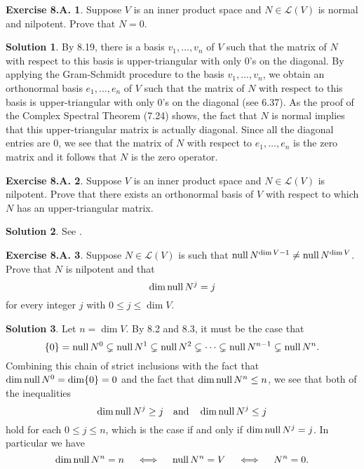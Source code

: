 \documentclass[12pt]{article}
\theoremstyle{definition}
\theoremstyle{exercise}
\newtheorem{exercise}{Exercise 8.A.}
\theoremstyle{solution}
\newtheorem*{solution}{Solution}
\newcommand{\lmap}{\mathcal{L}}
\newcommand{\Null}{\text{null\,}}
\newcommand{\quand}{\quad \text{and} \quad}
\newcommand{\quiff}{\quad \iff \quad}
\newcommand{\R}{\mathbf{R}}
\newcommand{\C}{\mathbf{C}}
\newcommand{\F}{\mathbf{F}}
\begin{document}
\begin{exercise}
\label{ex:13}
    Suppose \( V \) is an inner product space and \( N \in \lmap(V) \) is normal and nilpotent. Prove that \( N = 0 \).
\end{exercise}

\begin{solution}
    By 8.19, there is a basis \( v_1, \ldots, v_n \) of \( V \) such that the matrix of \( N \) with respect to this basis is upper-triangular with only 0's on the diagonal. By applying the Gram-Schmidt procedure to the basis \( v_1, \ldots, v_n \), we obtain an orthonormal basis \( e_1, \ldots, e_n \) of \( V \) such that the matrix of \( N \) with respect to this basis is upper-triangular with only 0's on the diagonal (see 6.37). As the proof of the Complex Spectral Theorem (7.24) shows, the fact that \( N \) is normal implies that this upper-triangular matrix is actually diagonal. Since all the diagonal entries are 0, we see that the matrix of \( N \) with respect to \( e_1, \ldots, e_n \) is the zero matrix and it follows that \( N \) is the zero operator.
\end{solution}

\begin{exercise}
\label{ex:14}
    Suppose \( V \) is an inner product space and \( N \in \lmap(V) \) is nilpotent. Prove that there exists an orthonormal basis of \( V \) with respect to which \( N \) has an upper-triangular matrix.
    \noindent [\textit{If \( \F = \C \) then the result above follows from Schur's Theorem (6.38) without the hypothesis that \( N \) is nilpotent. Thus the exercise above needs to be proved only when \( \F = \R \).}]
\end{exercise}

\begin{solution}
    See .
\end{solution}

\begin{exercise}
\label{ex:15}
    Suppose \( N \in \lmap(V) \) is such that \( \Null N^{\dim V - 1} \neq \Null N^{\dim V} \). Prove that \( N \) is nilpotent and that
    \[
        \dim \Null N^j = j
    \]
    for every integer \( j \) with \( 0 \leq j \leq \dim V \).
\end{exercise}

\begin{solution}
    Let \( n = \dim V \). By 8.2 and 8.3, it must be the case that
    \[
        \{ 0 \} = \Null N^0 \subsetneq \Null N^1 \subsetneq \Null N^2 \subsetneq \cdots \subsetneq \Null N^{n-1} \subsetneq \Null N^n.
    \]
    Combining this chain of strict inclusions with the fact that \( \dim \Null N^0 = \dim \{ 0 \} = 0 \) and the fact that \( \dim \Null N^n \leq n \), we see that both of the inequalities
    \[
        \dim \Null N^j \geq j \quand \dim \Null N^j \leq j
    \]
    hold for each \( 0 \leq j \leq n \), which is the case if and only if \( \dim \Null N^j = j \). In particular we have
    \[
        \dim \Null N^n = n \quiff \Null N^n = V \quiff N^n = 0.
    \]
\end{solution}
\end{document}
